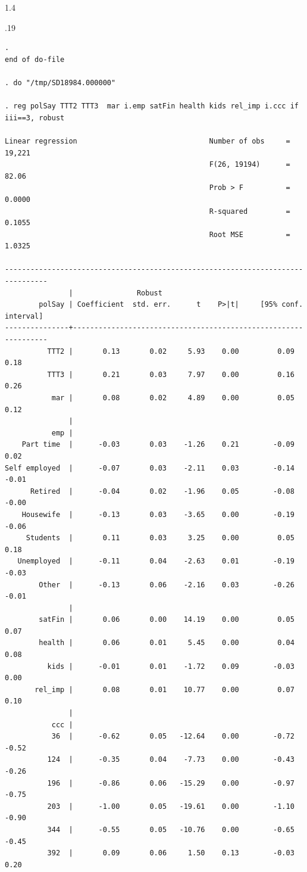 \documentclass[10pt, letterpaper]{article}
\begin{document}
\begin{spacing}{1.4}
\begin{scriptsize}
\begin{spacing}{.19}
\begin{verbatim}
. 
end of do-file

. do "/tmp/SD18984.000000"

. reg polSay TTT2 TTT3  mar i.emp satFin health kids rel_imp i.ccc if iii==3, robust

Linear regression                               Number of obs     =     19,221
                                                F(26, 19194)      =      82.06
                                                Prob > F          =     0.0000
                                                R-squared         =     0.1055
                                                Root MSE          =     1.0325

--------------------------------------------------------------------------------
               |               Robust
        polSay | Coefficient  std. err.      t    P>|t|     [95% conf. interval]
---------------+----------------------------------------------------------------
          TTT2 |       0.13       0.02     5.93    0.00         0.09        0.18
          TTT3 |       0.21       0.03     7.97    0.00         0.16        0.26
           mar |       0.08       0.02     4.89    0.00         0.05        0.12
               |
           emp |
    Part time  |      -0.03       0.03    -1.26    0.21        -0.09        0.02
Self employed  |      -0.07       0.03    -2.11    0.03        -0.14       -0.01
      Retired  |      -0.04       0.02    -1.96    0.05        -0.08       -0.00
    Housewife  |      -0.13       0.03    -3.65    0.00        -0.19       -0.06
     Students  |       0.11       0.03     3.25    0.00         0.05        0.18
   Unemployed  |      -0.11       0.04    -2.63    0.01        -0.19       -0.03
        Other  |      -0.13       0.06    -2.16    0.03        -0.26       -0.01
               |
        satFin |       0.06       0.00    14.19    0.00         0.05        0.07
        health |       0.06       0.01     5.45    0.00         0.04        0.08
          kids |      -0.01       0.01    -1.72    0.09        -0.03        0.00
       rel_imp |       0.08       0.01    10.77    0.00         0.07        0.10
               |
           ccc |
           36  |      -0.62       0.05   -12.64    0.00        -0.72       -0.52
          124  |      -0.35       0.04    -7.73    0.00        -0.43       -0.26
          196  |      -0.86       0.06   -15.29    0.00        -0.97       -0.75
          203  |      -1.00       0.05   -19.61    0.00        -1.10       -0.90
          344  |      -0.55       0.05   -10.76    0.00        -0.65       -0.45
          392  |       0.09       0.06     1.50    0.13        -0.03        0.20

\end{verbatim}
\end{spacing}
\end{scriptsize}
\end{spacing}
\end{document}

